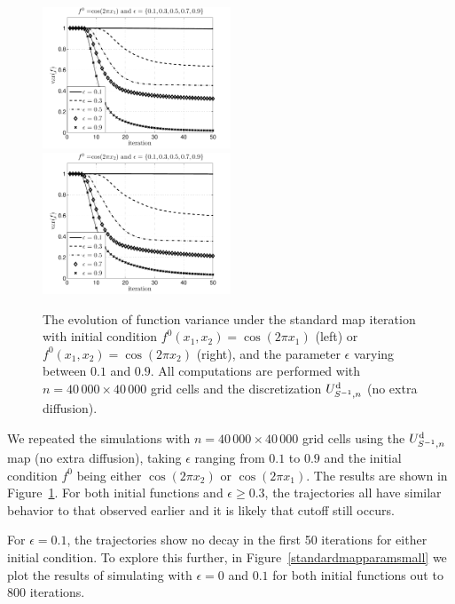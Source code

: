 \documentclass{aims}
\theoremstyle{definition}
\begin{document}
\begin{figure}
  \centerline{
    \includegraphics[width=0.5\textwidth,trim=0 0 0 22,clip=true]{standardmapparamx}
    \includegraphics[width=0.5\textwidth,trim=0 0 0 22,clip=true]{standardmapparamy}
  }
  \caption{\label{standardmapparamxy} The evolution of function
    variance under the standard map iteration with initial condition
    $f^0(x_1,x_2) = \cos(2\pi x_1)$ (left) or $f^0(x_1,x_2) =
    \cos(2\pi x_2)$ (right), and the parameter $\epsilon$ varying
    between $0.1$ and $0.9$. All computations are performed with
    $n=40\,000 \times 40\,000$ grid cells and the discretization
    $U_{S^{-1},n}^{\rm d}$ (no extra diffusion).}
\end{figure}

We repeated the simulations with $n=40\,000 \times 40\,000$ grid cells
using the $U_{S^{-1},n}^{\rm d}$ map (no extra diffusion), taking
$\epsilon$ ranging from $0.1$ to $0.9$ and the initial condition $f^0$
being either $\cos(2\pi x_2)$ or $\cos(2\pi x_1)$. The results are
shown in Figure~\ref{standardmapparamxy}. For both initial functions
and $\epsilon \ge 0.3$, the trajectories all have similar behavior to
that observed earlier and it is likely that cutoff still occurs.

For $\epsilon=0.1$, the trajectories show no decay in the first 50
iterations for either initial condition. To explore this further, in
Figure~\ref{standardmapparamsmall} we plot the results of simulating
with $\epsilon=0$ and $0.1$ for both initial functions out to $800$
iterations.
\end{document}
